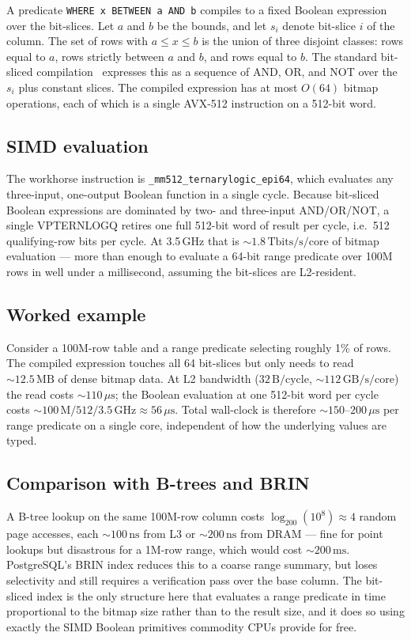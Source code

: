 \documentclass[10pt]{article}
\theoremstyle{definition}
\begin{document}
A predicate \texttt{WHERE x BETWEEN a AND b} compiles to a fixed Boolean expression over the bit-slices. Let $a$ and $b$ be the bounds, and let $s_i$ denote bit-slice $i$ of the column. The set of rows with $a \le x \le b$ is the union of three disjoint classes: rows equal to $a$, rows strictly between $a$ and $b$, and rows equal to $b$. The standard bit-sliced compilation~\citep{oneil_quass} expresses this as a sequence of AND, OR, and NOT over the $s_i$ plus constant slices. The compiled expression has at most $O(64)$ bitmap operations, each of which is a single AVX-512 instruction on a 512-bit word.

\subsection{SIMD evaluation}

The workhorse instruction is \texttt{\_mm512\_ternarylogic\_epi64}, which evaluates any three-input, one-output Boolean function in a single cycle. Because bit-sliced Boolean expressions are dominated by two- and three-input AND/OR/NOT, a single VPTERNLOGQ retires one full 512-bit word of result per cycle, i.e.\ 512 qualifying-row bits per cycle. At 3.5\,GHz that is $\sim\!1.8\,\text{Tbits/s/core}$ of bitmap evaluation --- more than enough to evaluate a 64-bit range predicate over 100M rows in well under a millisecond, assuming the bit-slices are L2-resident.

\subsection{Worked example}

Consider a 100M-row table and a range predicate selecting roughly 1\% of rows. The compiled expression touches all 64 bit-slices but only needs to read $\sim\!12.5\,\text{MB}$ of dense bitmap data. At L2 bandwidth ($32\,\text{B/cycle}$, $\sim\!112\,\text{GB/s/core}$) the read costs $\sim\!110\,\mu\text{s}$; the Boolean evaluation at one 512-bit word per cycle costs $\sim\!100\,\text{M}/512/3.5\,\text{GHz} \approx 56\,\mu\text{s}$. Total wall-clock is therefore $\sim\!150$--$200\,\mu\text{s}$ per range predicate on a single core, independent of how the underlying values are typed.

\subsection{Comparison with B-trees and BRIN}

A B-tree lookup on the same 100M-row column costs $\log_{200}(10^8) \approx 4$ random page accesses, each $\sim\!100\,\text{ns}$ from L3 or $\sim\!200\,\text{ns}$ from DRAM --- fine for point lookups but disastrous for a 1M-row range, which would cost $\sim\!200\,\text{ms}$. PostgreSQL's BRIN index reduces this to a coarse range summary, but loses selectivity and still requires a verification pass over the base column. The bit-sliced index is the only structure here that evaluates a range predicate in time proportional to the bitmap size rather than to the result size, and it does so using exactly the SIMD Boolean primitives commodity CPUs provide for free.
\end{document}

